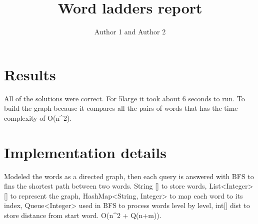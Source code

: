 \documentclass{article}
\title{Word ladders report}
\author{Author 1 and Author 2}
\begin{document}
  \maketitle

  \section{Results}


 All of the solutions were correct. For 5large it took about 6 seconds to run. To build the graph 
 because it compares all the pairs of words that has the time complexity of O(n^2).

  \section{Implementation details}


  Modeled the words as a directed graph, then each query is answered with BFS to fins the shortest 
  path between two words. String [] to store words, List<Integer>[] to represent the graph, 
  HashMap<String, Integer> to map each word to its index, Queue<Integer> used in BFS to process 
  words level by level, int[] dist to store distance from start word.  O(n^2 + Q(n+m)).
\end{document}
